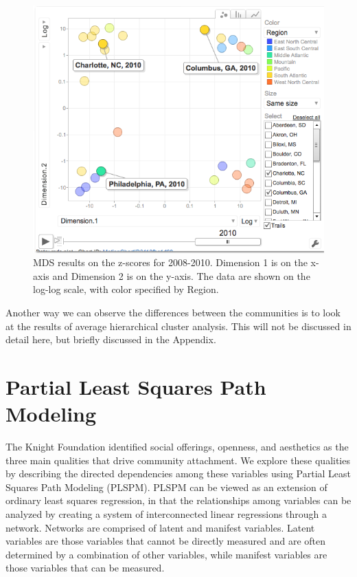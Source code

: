 \documentclass[11pt]{asaproc}
\begin{document}
\begin{figure}[h]
\begin{framed}
\hspace{0.5cm}
\begin{minipage}[b]{0.45\linewidth}
\centering
\includegraphics[width=\textwidth]{mdszscores10.png}
\end{minipage}
\hspace{0.5cm}
\begin{minipage}[b]{0.45\linewidth}
\centering
\caption{MDS results on the z-scores for
  2008-2010. Dimension 1 is on the x-axis and Dimension 2 is on the
  y-axis. The data are shown on the log-log scale, with color
  specified by Region.}
\label{fig:mdsMCzscores}
\end{minipage}
\end{framed}
\end{figure}

\pagebreak

Another way we can observe the differences between the communities is
to look at the results of average hierarchical cluster
analysis. This will not be discussed in detail here, but briefly
discussed in the 
Appendix. 

\section{Partial Least Squares Path Modeling}
The Knight Foundation identified social offerings, openness, and
aesthetics as the three main qualities that drive community
attachment. We explore these qualities by describing the directed
dependencies among these variables using Partial Least Squares Path
Modeling (PLSPM). PLSPM can be viewed as an extension of ordinary
least squares regression, in that the relationships among variables
can be analyzed by creating a system of interconnected linear
regressions through a network. Networks are comprised of latent and
manifest variables. Latent variables are those variables that cannot be directly
measured and are often determined by a combination of other variables,
while manifest variables are those variables that can be measured. 
\end{document}
